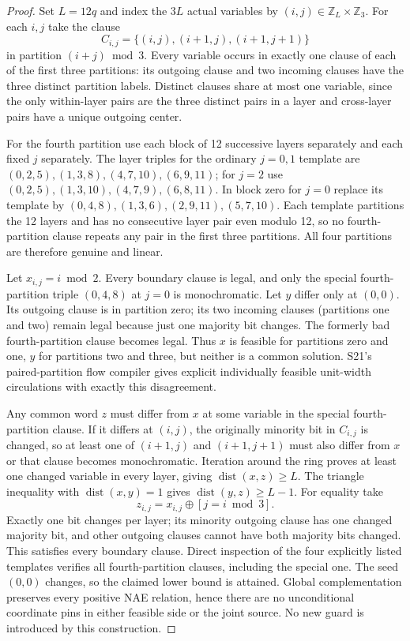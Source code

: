 \documentclass[11pt]{article}
\begin{document}
\begin{proof}
Set $L=12q$ and index the $3L$ actual variables by $(i,j)\in\mathbb Z_L\times\mathbb Z_3$. For each $i,j$ take the clause
\[
C_{i,j}=\{(i,j),(i+1,j),(i+1,j+1)\}
\]
in partition $(i+j)\bmod3$. Every variable occurs in exactly one clause of each of the first three partitions: its outgoing clause and two incoming clauses have the three distinct partition labels. Distinct clauses share at most one variable, since the only within-layer pairs are the three distinct pairs in a layer and cross-layer pairs have a unique outgoing center.

For the fourth partition use each block of 12 successive layers separately and each fixed $j$ separately. The layer triples for the ordinary $j=0,1$ template are $(0,2,5),(1,3,8),(4,7,10),(6,9,11)$; for $j=2$ use $(0,2,5),(1,3,10),(4,7,9),(6,8,11)$. In block zero for $j=0$ replace its template by $(0,4,8),(1,3,6),(2,9,11),(5,7,10)$. Each template partitions the 12 layers and has no consecutive layer pair even modulo 12, so no fourth-partition clause repeats any pair in the first three partitions. All four partitions are therefore genuine and linear.

Let $x_{i,j}=i\bmod2$. Every boundary clause is legal, and only the special fourth-partition triple $(0,4,8)$ at $j=0$ is monochromatic. Let $y$ differ only at $(0,0)$. Its outgoing clause is in partition zero; its two incoming clauses (partitions one and two) remain legal because just one majority bit changes. The formerly bad fourth-partition clause becomes legal. Thus $x$ is feasible for partitions zero and one, $y$ for partitions two and three, but neither is a common solution. S21's paired-partition flow compiler gives explicit individually feasible unit-width circulations with exactly this disagreement.

Any common word $z$ must differ from $x$ at some variable in the special fourth-partition clause. If it differs at $(i,j)$, the originally minority bit in $C_{i,j}$ is changed, so at least one of $(i+1,j)$ and $(i+1,j+1)$ must also differ from $x$ or that clause becomes monochromatic. Iteration around the ring proves at least one changed variable in every layer, giving $\operatorname{dist}(x,z)\ge L$. The triangle inequality with $\operatorname{dist}(x,y)=1$ gives $\operatorname{dist}(y,z)\ge L-1$. For equality take
\[
z_{i,j}=x_{i,j}\oplus [j=i\bmod3].
\]
Exactly one bit changes per layer; its minority outgoing clause has one changed majority bit, and other outgoing clauses cannot have both majority bits changed. This satisfies every boundary clause. Direct inspection of the four explicitly listed templates verifies all fourth-partition clauses, including the special one. The seed $(0,0)$ changes, so the claimed lower bound is attained. Global complementation preserves every positive NAE relation, hence there are no unconditional coordinate pins in either feasible side or the joint source. No new guard is introduced by this construction.
\end{proof}
\end{document}
